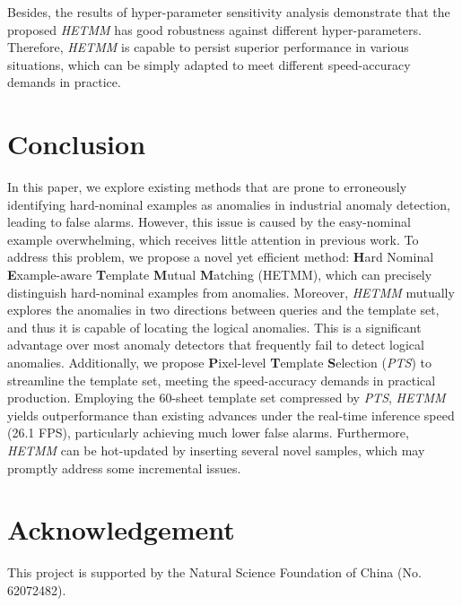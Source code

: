 \documentclass[default,iicol]{sn-jnl}\usepackage[algo2e,ruled,linesnumbered]{algorithm2e}
\theoremstyle{thmstyleone}\newtheorem{theorem}{Theorem}\newtheorem{proposition}[theorem]{Proposition}
\theoremstyle{thmstyletwo}\newtheorem{example}{Example}\newtheorem{remark}{Remark}
\theoremstyle{thmstylethree}\newtheorem{definition}{Definition}
\begin{document}
Besides, the results of hyper-parameter sensitivity analysis demonstrate that the proposed \textit{HETMM} has good robustness against different hyper-parameters.
Therefore, \textit{HETMM} is capable to persist superior performance in various situations, which can be simply adapted to meet different speed-accuracy demands in practice.

\section{Conclusion}
In this paper, we explore existing methods that are prone to erroneously identifying hard-nominal examples as anomalies in industrial anomaly detection, leading to false alarms.
However, this issue is caused by the easy-nominal example overwhelming, which receives little attention in previous work.
To address this problem, we propose a novel yet efficient method: \textbf{H}ard Nominal \textbf{E}xample-aware \textbf{T}emplate \textbf{M}utual \textbf{M}atching (HETMM), which can precisely distinguish hard-nominal examples from anomalies.
Moreover, \textit{HETMM} mutually explores the anomalies in two directions between queries and the template set, and thus it is capable of locating the logical anomalies.
This is a significant advantage over most anomaly detectors that frequently fail to detect logical anomalies.
Additionally, we propose \textbf{P}ixel-level \textbf{T}emplate \textbf{S}election (\textit{PTS}) to streamline the template set, meeting the speed-accuracy demands in practical production.
Employing the 60-sheet template set compressed by \textit{PTS}, \textit{HETMM} yields outperformance than existing advances under the real-time inference speed (26.1 FPS), particularly achieving much lower false alarms.
Furthermore, \textit{HETMM} can be hot-updated by inserting several novel samples, which may promptly address some incremental issues.

\section*{Acknowledgement}
This project is supported by the Natural Science Foundation of China (No. 62072482).





















\end{document}
